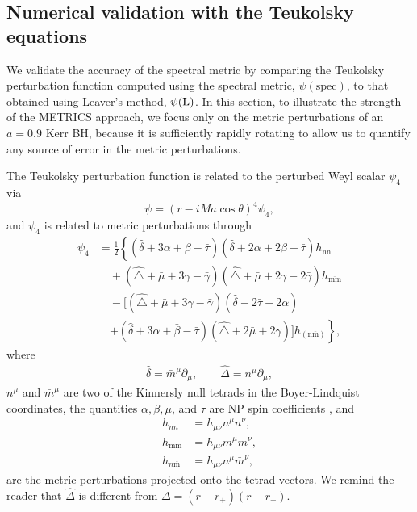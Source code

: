 \documentclass[aps,prx,amsmath,floats,floatfix,twocolumn,
  superscriptaddress,nofootinbib,showpacs]{revtex4-1}
\begin{document}
\subsection{Numerical validation with the Teukolsky equations}
\label{sec:metric_numerical_validation}

We validate the accuracy of the spectral metric by comparing the Teukolsky perturbation function  computed using the spectral metric, $\psi (\text{spec})$, to that obtained using Leaver's method, $\psi (\rm L)$.
In this section, to illustrate the strength of the METRICS approach, we focus only on the metric perturbations of an $a=0.9$ Kerr BH, because it is sufficiently rapidly rotating to allow us to quantify any source of error in the metric perturbations. 

The Teukolsky perturbation function is related to the perturbed  
Weyl scalar $\psi_4$ via
\begin{equation}\label{eq:psi_psi_4_relation}
\psi = (r-i M a\cos \theta)^4 \psi_4, 
\end{equation}
and $\psi_4$ is related to metric perturbations through \cite{PhysRevD.11.2042, Whiting_Price_2005, Lousto:2005xu}
\begin{align}
\label{eq:psi_4_metric_relation}
 \psi_4 
& =  \frac{1}{2}\left\{(\hat{\delta}+3 \alpha+\bar{\beta}-\bar{\tau})(\hat{\delta}+2 \alpha+2 \bar{\beta}-\bar{\tau}) h_{\mathrm{nn}} \right. 
\nonumber \\
& \quad +(\hat{\triangle}+\bar{\mu}+3 \gamma-\bar{\gamma})(\hat{\triangle}+\bar{\mu}+2 \gamma-2 \bar{\gamma}) h_{\overline{\mathrm{mm}}}
\nonumber  \\
& \quad -[(\hat{\triangle}+\bar{\mu}+3 \gamma-\bar{\gamma})(\hat{\delta}-2 \bar{\tau}+2 \alpha) 
\nonumber \\
& \quad \left.+(\hat{\delta}+3 \alpha+\bar{\beta}-\bar{\tau})(\hat{\triangle}+2 \bar{\mu}+2 \gamma)] h_{(\mathrm{n} \overline{\mathrm{m}})} \right\},
\end{align}
where 
\begin{equation}
\begin{split}
 \hat{\delta} = \bar{m}^{\mu} \partial_{\mu}, \qquad
 \hat{\Delta} = n^{\mu} \partial_{\mu}, 
\end{split}
\end{equation}
$n^{\mu}$ and $\bar{m}^{\mu}$ are two of the Kinnersly null tetrads in the Boyer-Lindquist coordinates, the quantities $\alpha, \beta, \mu$, and $\tau$ are NP spin coefficients \cite{Teukolsky_01_PRL, Teukolsky:1973ha, Teukolsky:1974yv, Loutrel_Ripley_Giorgi_Pretorius_2020}, and
\begin{equation}
\begin{split}
h_{nn} & = h_{\mu \nu} n^{\mu} n^{\nu}, \\
h_{\overline{\mathrm{mm}}} & =h_{\mu \nu} \bar{m}^{\mu} \bar{m}^{\nu}, \\
h_{n \overline{\mathrm{m}}} & =h_{\mu \nu} n^{\mu} \bar{m}^{\nu},
\end{split}
\end{equation}
are the metric perturbations projected onto the tetrad vectors. 
We remind the reader that $\hat{\Delta}$ is different from $\Delta = (r-r_+)(r-r_-)$. 
\end{document}
